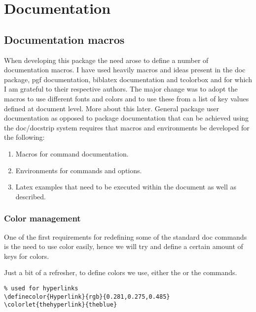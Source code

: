 

\thispagestyle{plain}
\chapter{Documentation}


\section{Documentation macros}

When developing this package the need arose to define a number of documentation macros. I have used heavily macros and ideas present in the doc package, pgf documentation, biblatex documentation  and tcolorbox and for which I am grateful to their respective authors. The major change was to adopt the macros to use different fonts and colors and to use these from a list of key values defined at document level. More about this later. General package user documentation as opposed to package documentation that can be achieved using the doc/docstrip system requires that macros and environments be developed for the following:

\begin{enumerate}
\item Macros for command documentation.
\item Environments for commands and options.
\item Latex examples that need to be executed within the document as well as described.
\end{enumerate}

\subsection{Color management}
One of the first requirements for redefining some of the standard doc commands is the need to use color easily, hence we will try and define a certain amount of keys for colors.

Just a bit of a refresher, to define colors we use, either the  or the  commands.

\begin{tcolorbox}
\begin{lstlisting}
% used for hyperlinks
\definecolor{Hyperlink}{rgb}{0.281,0.275,0.485}
\colorlet{thehyperlink}{theblue}
\end{lstlisting}
\end{tcolorbox}

